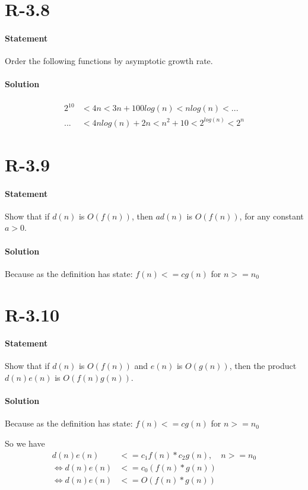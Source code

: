 \documentclass{article}
\begin{document}
\section{R-3.8}
\paragraph{Statement}
Order the following functions by asymptotic growth rate.
\paragraph{Solution}
  \begin{align*}
    2^{10} &< 4n < 3n+100log(n) < nlog(n) < ... \\
    ... &< 4nlog(n) + 2n<n^2+10<2^{log(n)}<2^n
  \end{align*}
\section{R-3.9}
\paragraph{Statement}
Show that if $d(n)$ is $O(f(n))$, then $ad(n)$ is $O(f(n))$, for any constant $a > 0$.
\paragraph{Solution}
  Because as the definition has state: $f(n) <= cg(n)$ for $n>=n_{0}$
\section{R-3.10}
\paragraph{Statement}
Show that if $d(n)$ is $O(f(n))$ and $e(n)$ is $O(g(n))$, then the product $d(n)e(n)$
is $O(f(n)g(n))$.
\paragraph{Solution}
  Because as the definition has state: $f(n) <= cg(n)$ for $n>=n_{0}$
  \par So we have 
  \begin{align*}
    d(n)e(n) &<= c_{1}f(n) * c_{2}g(n), \quad n>=n_{0} \\
    \Leftrightarrow d(n)e(n) &<= c_{0}(f(n) * g(n))\\
    \Leftrightarrow d(n)e(n) &<= O(f(n) * g(n))
  \end{align*}
\end{document}
